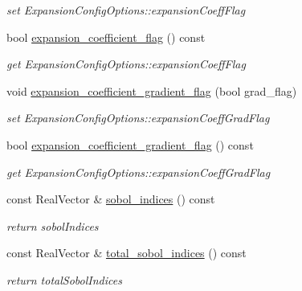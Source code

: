 \begin{DoxyCompactItemize}
\begin{DoxyCompactList}\small\item\em set Expansion\+Config\+Options\+::expansion\+Coeff\+Flag \end{DoxyCompactList}\item 
bool \hyperlink{classPecos_1_1PolynomialApproximation_a89548e99400489d6e02b31fefcd5ad65}{expansion\+\_\+coefficient\+\_\+flag} () const \label{classPecos_1_1PolynomialApproximation_a89548e99400489d6e02b31fefcd5ad65}

\begin{DoxyCompactList}\small\item\em get Expansion\+Config\+Options\+::expansion\+Coeff\+Flag \end{DoxyCompactList}\item 
void \hyperlink{classPecos_1_1PolynomialApproximation_a5f71234d90af02a1e05682e4f4a075b5}{expansion\+\_\+coefficient\+\_\+gradient\+\_\+flag} (bool grad\+\_\+flag)\label{classPecos_1_1PolynomialApproximation_a5f71234d90af02a1e05682e4f4a075b5}

\begin{DoxyCompactList}\small\item\em set Expansion\+Config\+Options\+::expansion\+Coeff\+Grad\+Flag \end{DoxyCompactList}\item 
bool \hyperlink{classPecos_1_1PolynomialApproximation_a409e9b9d4a9d4bc2f6ca5b791d70af1a}{expansion\+\_\+coefficient\+\_\+gradient\+\_\+flag} () const \label{classPecos_1_1PolynomialApproximation_a409e9b9d4a9d4bc2f6ca5b791d70af1a}

\begin{DoxyCompactList}\small\item\em get Expansion\+Config\+Options\+::expansion\+Coeff\+Grad\+Flag \end{DoxyCompactList}\item 
const Real\+Vector \& \hyperlink{classPecos_1_1PolynomialApproximation_a08e328106adf656e3cee47ea689d2f13}{sobol\+\_\+indices} () const \label{classPecos_1_1PolynomialApproximation_a08e328106adf656e3cee47ea689d2f13}

\begin{DoxyCompactList}\small\item\em return sobol\+Indices \end{DoxyCompactList}\item 
const Real\+Vector \& \hyperlink{classPecos_1_1PolynomialApproximation_aeaab4fe47cd3ede82c8939c1bb0489fb}{total\+\_\+sobol\+\_\+indices} () const \label{classPecos_1_1PolynomialApproximation_aeaab4fe47cd3ede82c8939c1bb0489fb}

\begin{DoxyCompactList}\small\item\em return total\+Sobol\+Indices \end{DoxyCompactList}\end{DoxyCompactItemize}

